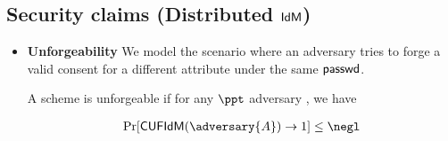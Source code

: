 \subsection{Security claims (Distributed $\textsf{IdM}$)}
\begin{itemize}
    \item \textbf{Unforgeability} We model the scenario where an adversary tries to forge a valid consent for a different attribute under the same $\textsf{passwd}$.

    \begin{definition}
    A \primitive scheme is unforgeable if for any $\ppt$ adversary , we have

    \begin{align*}
    \Pr[\cuf\idm(\adversary{A}) \rightarrow 1] \le \negl
\end{align*}


\end{definition}
\end{itemize}
